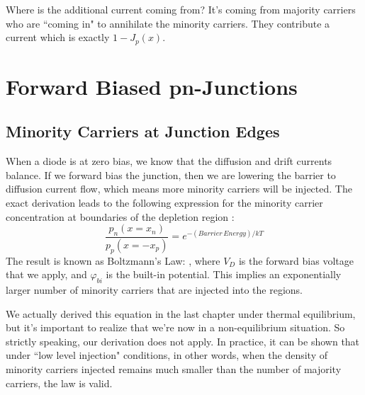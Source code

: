Where is the additional current coming from?  It's coming from majority carriers who are ``coming in" to annihilate the minority carriers.  They contribute a current which is exactly $1- J_p(x)$.  
\section{Forward Biased pn-Junctions}
\subsection{Minority Carriers at Junction Edges}
When a diode is at zero bias, we know that the diffusion and drift currents balance.  If we forward bias the junction, then we are lowering the barrier to diffusion current flow, which means more minority carriers will be injected.  The exact derivation leads to the following expression for the minority carrier concentration at boundaries of the depletion region :
\begin{equation} 
	\frac{{{p_n}(x = {x_n})}}{{{p_p}(x =  - {x_p})}} =  {e^{ - (Barrier\,Energy)/kT}}
\end{equation}
The result is known as Boltzmann's Law:
, where $V_D$ is the forward bias voltage that we apply, and $\varphi_{bi}$ is the built-in potential.  This implies an exponentially larger number of minority carriers that are injected into the regions.

We actually derived this equation in the last chapter under thermal equilibrium, but it's important to realize that we're now in a non-equilibrium situation.  So strictly speaking, our derivation does not apply.  In practice, it can be shown that under ``low level injection" conditions, in other words, when the density of minority carriers injected remains much smaller than the number of majority carriers, the law is valid.

